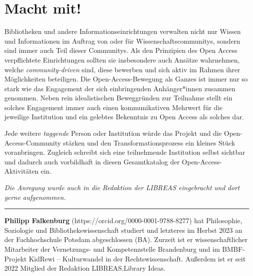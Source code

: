 \documentclass[a4paper,
fontsize=11pt,
oneside,
numbers=noperiodatend,
parskip=half-,
bibliography=totoc,
final
]{scrartcl}
\begin{document}
\hypertarget{macht-mit}{%
\section{Macht mit!}\label{macht-mit}}

Bibliotheken und andere Informationseinrichtungen verwalten nicht nur
Wissen und Informationen im Auftrag von oder für
Wissenschaftscommunitys, sondern sind immer auch Teil dieser Communitys.
Als den Prinzipien des Open Access verpflichtete Einrichtungen sollten
sie insbesondere auch Ansätze wahrnehmen, welche \emph{community-driven}
sind, diese bewerben und sich aktiv im Rahmen ihrer Möglichkeiten
beteiligen. Die Open-Access-Bewegung als Ganzes ist immer nur so stark
wie das Engagement der sich einbringenden Anhänger*innen zusammen
genommen. Neben rein idealistischen Beweggründen zur Teilnahme stellt
ein solches Engagement immer auch einen kommunikativen Mehrwert für die
jeweilige Institution und ein gelebtes Bekenntnis zu Open Access als
solches dar.

Jede weitere \emph{taggende} Person oder Institution würde das Projekt
und die Open-Access-Community stärken und den Transformationsprozess ein
kleines Stück voranbringen. Zugleich schreibt sich eine teilnehmende
Institution selbst sichtbar und dadurch auch vorbildhaft in diesen
Gesamtkatalog der Open-Access-Aktivitäten ein.

\emph{Die Anregung wurde auch in die Redaktion der LIBREAS eingebracht
und dort gerne aufgenommen.}

\begin{center}\rule{0.5\linewidth}{0.5pt}\end{center}

\textbf{Philipp Falkenburg} (https://orcid.org/0000-0001-9788-8277) hat
Philosophie, Soziologie und Bibliothekswissenschaft studiert und
letzteres im Herbst 2023 an der Fachhochschule Potsdam abgeschlossen
(BA). Zurzeit ist er wissenschaftlicher Mitarbeiter der Vernetzungs- und
Kompetenzstelle Brandenburg und im BMBF-Projekt KidRewi -- Kulturwandel
in der Rechtswissenschaft. Außerdem ist er seit 2022 Mitglied der
Redaktion LIBREAS.Library Ideas.
\end{document}
